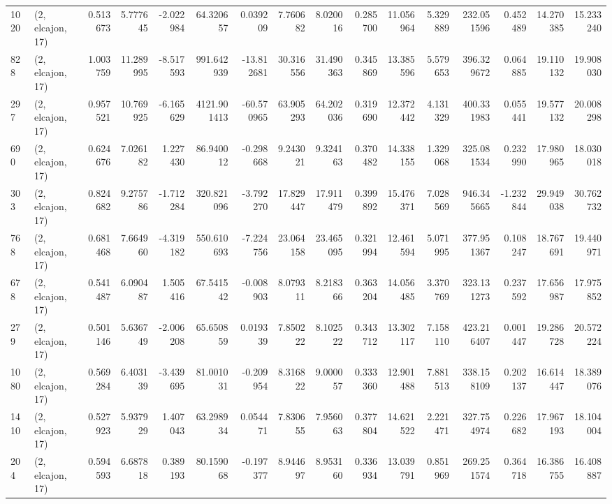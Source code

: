 \begin{tabular}{llrrrrrrrrrrrrrr}
1020 &  (2, elcajon, 17) &   0.513673 &   5.777645 &  -2.022984 &     64.320657 &    0.039209 &    7.760682 &    8.020016 &  0.285700 &  11.056964 &   5.329889 &   232.051596 &   0.452489 &  14.270385 &  15.233240 \\
828  &  (2, elcajon, 17) &   1.003759 &  11.289995 &  -8.517593 &    991.642939 &  -13.812681 &   30.316556 &   31.490363 &  0.345869 &  13.385596 &   5.579653 &   396.329672 &   0.064885 &  19.110132 &  19.908030 \\
297  &  (2, elcajon, 17) &   0.957521 &  10.769925 &  -6.165629 &   4121.901413 &  -60.570965 &   63.905293 &   64.202036 &  0.319690 &  12.372442 &   4.131329 &   400.331983 &   0.055441 &  19.577132 &  20.008298 \\
690  &  (2, elcajon, 17) &   0.624676 &   7.026182 &   1.227430 &     86.940012 &   -0.298668 &    9.243021 &    9.324163 &  0.370482 &  14.338155 &   1.329068 &   325.081534 &   0.232990 &  17.980965 &  18.030018 \\
303  &  (2, elcajon, 17) &   0.824682 &   9.275786 &  -1.712284 &    320.821096 &   -3.792270 &   17.829447 &   17.911479 &  0.399892 &  15.476371 &   7.028569 &   946.345665 &  -1.232844 &  29.949038 &  30.762732 \\
768  &  (2, elcajon, 17) &   0.681468 &   7.664960 &  -4.319182 &    550.610693 &   -7.224756 &   23.064158 &   23.465095 &  0.321994 &  12.461594 &   5.071995 &   377.951367 &   0.108247 &  18.767691 &  19.440971 \\
678  &  (2, elcajon, 17) &   0.541487 &   6.090487 &   1.505416 &     67.541542 &   -0.008903 &    8.079311 &    8.218366 &  0.363204 &  14.056485 &   3.370769 &   323.131273 &   0.237592 &  17.656987 &  17.975852 \\
279  &  (2, elcajon, 17) &   0.501146 &   5.636749 &  -2.006208 &     65.650859 &    0.019339 &    7.850222 &    8.102522 &  0.343712 &  13.302117 &   7.158110 &   423.216407 &   0.001447 &  19.286728 &  20.572224 \\
1080 &  (2, elcajon, 17) &   0.569284 &   6.403139 &  -3.439695 &     81.001031 &   -0.209954 &    8.316822 &    9.000057 &  0.333360 &  12.901488 &   7.881513 &   338.158109 &   0.202137 &  16.614447 &  18.389076 \\
1410 &  (2, elcajon, 17) &   0.527923 &   5.937929 &   1.407043 &     63.298934 &    0.054471 &    7.830655 &    7.956063 &  0.377804 &  14.621522 &   2.221471 &   327.754974 &   0.226682 &  17.967193 &  18.104004 \\
204  &  (2, elcajon, 17) &   0.594593 &   6.687818 &   0.389193 &     80.159068 &   -0.197377 &    8.944697 &    8.953160 &  0.336934 &  13.039791 &   0.851969 &   269.251574 &   0.364718 &  16.386755 &  16.408887 \\

\end{tabular}
